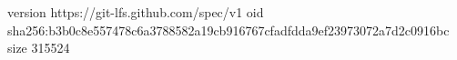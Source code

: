 version https://git-lfs.github.com/spec/v1
oid sha256:b3b0c8e557478c6a3788582a19cb916767cfadfdda9ef23973072a7d2c0916bc
size 315524
